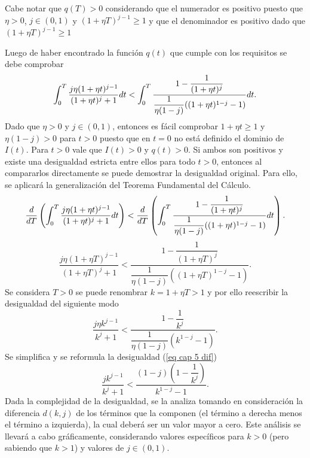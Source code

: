 Cabe notar que $q(T)>0$ considerando que el numerador es positivo puesto que $\eta>0$, $j\in (0,1)$ y $(1+\eta T)^{j-1} \geq 1$ y que el denominador es positivo dado que $(1+\eta T)^{j-1} \geq 1$

Luego de haber encontrado la función $q(t)$ que cumple con los requisitos se debe comprobar
%
$$\displaystyle \int_0^{T}\dfrac{j\eta(1+\eta t)^{j-1}}{(1+\eta t)^j+1}dt<\displaystyle \int_0^{T} \dfrac{1 - \dfrac{1}{(1+\eta t)^j}}{\dfrac{1}{\eta(1-j)}((1+\eta t)^{1-j}-1)} dt.$$
%
Dado que $\eta>0$ y $j\in (0,1)$, entonces es fácil comprobar $1+\eta t \geq 1$ y $\eta(1-j)>0$ para $t>0$ puesto que en $t=0$ no está definido el dominio de $I(t)$. Para $t>0$ vale que $I(t)> 0$ y $q(t)> 0$. Si ambos son positivos y existe una desigualdad estricta entre ellos para todo $t > 0$, entonces al compararlos directamente se puede demostrar la desigualdad original. Para ello, se aplicará la generalización del Teorema Fundamental del Cálculo.
%
$$\dfrac{d}{dT}\left(\displaystyle \int_0^{T}\dfrac{j\eta(1+\eta t)^{j-1}}{(1+\eta t)^j+1}dt\right)<\dfrac{d}{dT}\left(\displaystyle \displaystyle \int_0^{T} \dfrac{1 - \dfrac{1}{(1+\eta t)^j}}{\dfrac{1}{\eta(1-j)}((1+\eta t)^{1-j}-1)} dt\right).$$
$$\dfrac{j\eta(1+\eta T)^{j-1}}{(1+\eta T)^j+1}<\dfrac{1 - \dfrac{1}{(1+\eta T)^j}}{\dfrac{1}{\eta(1-j)}((1+\eta T)^{1-j}-1)}.$$
%
Se considera $T>0$ se puede renombrar $k=1+ \eta T>1$ y por ello reescribir la desigualdad del siguiente modo
\begin{equation}
\label{eq cap 5 dif}
    \dfrac{j\eta k^{j-1}}{k^j+1}<\dfrac{1 - \dfrac{1}{k^j}}{\dfrac{1}{\eta(1-j)}(k^{1-j}-1)}.
\end{equation}
Se simplifica y se reformula la desigualdad (\ref{eq cap 5 dif})  
$$\dfrac{j k^{j-1}}{k^j+1}<\dfrac{(1-j) \left(1 - \dfrac{1}{k^j}\right)}{k^{1-j}-1}.$$
Dada la complejidad de la desigualdad, se la analiza tomando en consideración la diferencia $d(k,j)$ de los términos que la componen (el término a derecha menos el término a izquierda), la cual deberá ser un valor mayor a cero. Este análisis se llevará a cabo gráficamente, considerando valores específicos para $k>0$ (pero sabiendo que $k>1$) y valores de $j \in (0,1)$. 

